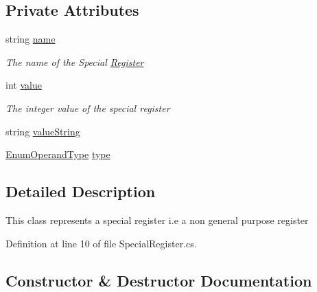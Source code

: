 \subsection*{Private Attributes}
\begin{DoxyCompactItemize}
\item 
string \hyperlink{class_c_p_u___o_s___simulator_1_1_c_p_u_1_1_special_register_ac521aef66f5fe6a88486e70f5ade8326}{name}
\begin{DoxyCompactList}\small\item\em The name of the Special \hyperlink{class_c_p_u___o_s___simulator_1_1_c_p_u_1_1_register}{Register} \end{DoxyCompactList}\item 
int \hyperlink{class_c_p_u___o_s___simulator_1_1_c_p_u_1_1_special_register_a040dbed0c42c3a45ccb7b01d181dd829}{value}
\begin{DoxyCompactList}\small\item\em The integer value of the special register \end{DoxyCompactList}\item 
string \hyperlink{class_c_p_u___o_s___simulator_1_1_c_p_u_1_1_special_register_a540a55b17a53591312e76689d051abac}{value\+String}
\item 
\hyperlink{namespace_c_p_u___o_s___simulator_1_1_c_p_u_ad49cfe442b74115a326c03b7ae848f76}{Enum\+Operand\+Type} \hyperlink{class_c_p_u___o_s___simulator_1_1_c_p_u_1_1_special_register_aae2bca6c1354013cca156bd19c30640d}{type}
\end{DoxyCompactItemize}


\subsection{Detailed Description}
This class represents a special register i.\+e a non general purpose register 



Definition at line 10 of file Special\+Register.\+cs.



\subsection{Constructor \& Destructor Documentation}
\hypertarget{class_c_p_u___o_s___simulator_1_1_c_p_u_1_1_special_register_a697f3e6f938ad7ab0ceee0555fe2c312}{}
